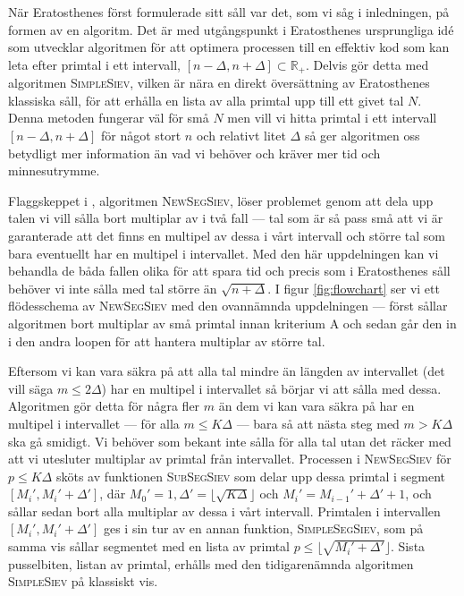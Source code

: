 


När Eratosthenes först formulerade sitt såll var det, som vi såg i inledningen, på formen av en algoritm. Det är med utgångspunkt i Eratosthenes ursprungliga idé som \cite{HaraldSieve} utvecklar algoritmen för att optimera processen till en effektiv kod som kan leta efter primtal i ett intervall, $[n - \Delta, n + \Delta] \subset \mathbb{R}_+$. Delvis gör \cite{HaraldSieve} detta med algoritmen \textsc{SimpleSiev}, vilken är nära en direkt översättning av Eratosthenes klassiska såll, för att erhålla en lista av alla primtal upp till ett givet tal $N$. Denna metoden fungerar väl för små $N$ men vill vi hitta primtal i ett intervall $[n - \Delta, n + \Delta]$ för något stort $n$ och relativt litet $\Delta$ så ger algoritmen oss betydligt mer information än vad vi behöver och kräver mer tid och minnesutrymme. 

%

Flaggskeppet i \cite{HaraldSieve}, algoritmen \textsc{NewSegSiev}, löser problemet genom att dela upp talen vi vill sålla bort multiplar av i två fall --- tal som är så pass små att vi är garanterade att det finns en multipel av dessa i vårt intervall och större tal som bara eventuellt har en multipel i intervallet. Med den här uppdelningen kan vi behandla de båda fallen olika för att spara tid och precis som i Eratosthenes såll behöver vi inte sålla med tal större än \(\sqrt{n + \Delta}\). I figur \ref{fig:flowchart} ser vi ett flödesschema av \textsc{NewSegSiev} med den ovannämnda uppdelningen --- först sållar algoritmen bort multiplar av små primtal innan kriterium A och sedan går den in i den andra loopen för att hantera multiplar av större tal. 

Eftersom vi kan vara säkra på att alla tal mindre än längden av intervallet (det vill säga \(m \leq 2 \Delta\)) har en multipel i intervallet så börjar vi att sålla med dessa. Algoritmen gör detta för några fler \(m\) än dem vi kan vara säkra på har en multipel i intervallet --- för alla \(m \leq K \Delta\) --- bara så att nästa steg med \(m > K \Delta\) ska gå smidigt. Vi behöver som bekant inte sålla för alla tal utan det räcker med att vi utesluter multiplar av primtal från intervallet. Processen i \textsc{NewSegSiev} för \(p \leq K \Delta\) sköts av funktionen \textsc{SubSegSiev} som delar upp dessa primtal i segment \([M_i', M_i' + \Delta']\), där \(M_0' = 1, \Delta' = \lfloor \sqrt{K \Delta} \rfloor\) och \(M_i' = M_{i-1}' + \Delta' + 1\), och sållar sedan bort alla multiplar av dessa i vårt intervall. Primtalen i intervallen \([M_i', M_i' + \Delta']\) ges i sin tur av en annan funktion, \textsc{SimpleSegSiev}, som på samma vis sållar segmentet med en lista av primtal \(p \leq \lfloor\sqrt{M_i' + \Delta'}\rfloor\). Sista pusselbiten, listan av primtal, erhålls med den tidigarenämnda algoritmen \textsc{SimpleSiev} på klassiskt vis. 

